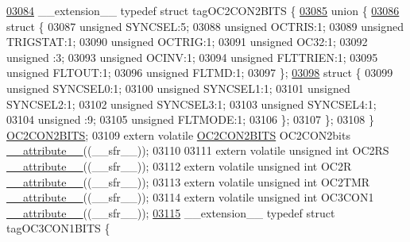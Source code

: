 \begin{DoxyCode}
\hypertarget{a00015_source_l03084}{}\hyperlink{a00014}{03084} \_\_extension\_\_ \textcolor{keyword}{typedef} \textcolor{keyword}{struct }tagOC2CON2BITS \{
\hypertarget{a00015_source_l03085}{}\hyperlink{a00015}{03085}   \textcolor{keyword}{union }\{
\hypertarget{a00015_source_l03086}{}\hyperlink{a00015}{03086}     \textcolor{keyword}{struct }\{
03087       \textcolor{keywordtype}{unsigned} SYNCSEL:5;
03088       \textcolor{keywordtype}{unsigned} OCTRIS:1;
03089       \textcolor{keywordtype}{unsigned} TRIGSTAT:1;
03090       \textcolor{keywordtype}{unsigned} OCTRIG:1;
03091       \textcolor{keywordtype}{unsigned} OC32:1;
03092       \textcolor{keywordtype}{unsigned} :3;
03093       \textcolor{keywordtype}{unsigned} OCINV:1;
03094       \textcolor{keywordtype}{unsigned} FLTTRIEN:1;
03095       \textcolor{keywordtype}{unsigned} FLTOUT:1;
03096       \textcolor{keywordtype}{unsigned} FLTMD:1;
03097     \};
\hypertarget{a00015_source_l03098}{}\hyperlink{a00015}{03098}     \textcolor{keyword}{struct }\{
03099       \textcolor{keywordtype}{unsigned} SYNCSEL0:1;
03100       \textcolor{keywordtype}{unsigned} SYNCSEL1:1;
03101       \textcolor{keywordtype}{unsigned} SYNCSEL2:1;
03102       \textcolor{keywordtype}{unsigned} SYNCSEL3:1;
03103       \textcolor{keywordtype}{unsigned} SYNCSEL4:1;
03104       \textcolor{keywordtype}{unsigned} :9;
03105       \textcolor{keywordtype}{unsigned} FLTMODE:1;
03106     \};
03107   \};
03108 \} \hyperlink{a00014_dc/db1/a00621}{OC2CON2BITS};
03109 \textcolor{keyword}{extern} \textcolor{keyword}{volatile} \hyperlink{a00014_dc/db1/a00621}{OC2CON2BITS} OC2CON2bits \hyperlink{a00015_a493c46f03454991ccc5aa7a6e1dfb2a7}{\_\_attribute\_\_}((\_\_sfr\_\_));
03110 
03111 \textcolor{keyword}{extern} \textcolor{keyword}{volatile} \textcolor{keywordtype}{unsigned} \textcolor{keywordtype}{int}  OC2RS \hyperlink{a00015_a493c46f03454991ccc5aa7a6e1dfb2a7}{\_\_attribute\_\_}((\_\_sfr\_\_));
03112 \textcolor{keyword}{extern} \textcolor{keyword}{volatile} \textcolor{keywordtype}{unsigned} \textcolor{keywordtype}{int}  OC2R \hyperlink{a00015_a493c46f03454991ccc5aa7a6e1dfb2a7}{\_\_attribute\_\_}((\_\_sfr\_\_));
03113 \textcolor{keyword}{extern} \textcolor{keyword}{volatile} \textcolor{keywordtype}{unsigned} \textcolor{keywordtype}{int}  OC2TMR \hyperlink{a00015_a493c46f03454991ccc5aa7a6e1dfb2a7}{\_\_attribute\_\_}((\_\_sfr\_\_));
03114 \textcolor{keyword}{extern} \textcolor{keyword}{volatile} \textcolor{keywordtype}{unsigned} \textcolor{keywordtype}{int}  OC3CON1 \hyperlink{a00015_a493c46f03454991ccc5aa7a6e1dfb2a7}{\_\_attribute\_\_}((\_\_sfr\_\_));
\hypertarget{a00015_source_l03115}{}\hyperlink{a00014}{03115} \_\_extension\_\_ \textcolor{keyword}{typedef} \textcolor{keyword}{struct }tagOC3CON1BITS \{

\end{DoxyCode}
